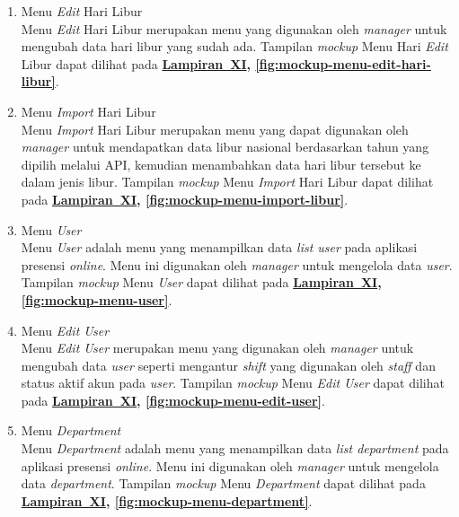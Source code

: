 \begin{enumerate}
    \item Menu \textit{Edit} Hari Libur
    \\ Menu \textit{Edit} Hari Libur merupakan menu yang digunakan oleh \textit{manager} untuk mengubah data hari libur yang sudah ada. Tampilan \textit{mockup} Menu Hari \textit{Edit} Libur dapat dilihat pada \textbf{\hyperref[sec:mockup-aplikasi-presensi-online]{Lampiran~XI}, \ref{fig:mockup-menu-edit-hari-libur}}.

    \item Menu \textit{Import} Hari Libur
    \\ Menu \textit{Import} Hari Libur merupakan menu yang dapat digunakan oleh \textit{manager} untuk mendapatkan data libur nasional berdasarkan tahun yang dipilih melalui API, kemudian menambahkan data hari libur tersebut ke dalam jenis libur. Tampilan \textit{mockup} Menu \textit{Import} Hari Libur dapat dilihat pada \textbf{\hyperref[sec:mockup-aplikasi-presensi-online]{Lampiran~XI}, \ref{fig:mockup-menu-import-libur}}.

    \item Menu \textit{User}
    \\ Menu \textit{User} adalah menu yang menampilkan data \textit{list user} pada aplikasi presensi \textit{online}. Menu ini digunakan oleh \textit{manager} untuk mengelola data \textit{user}. Tampilan \textit{mockup} Menu \textit{User} dapat dilihat pada \textbf{\hyperref[sec:mockup-aplikasi-presensi-online]{Lampiran~XI}, \ref{fig:mockup-menu-user}}.

    \item Menu \textit{Edit User}
    \\ Menu \textit{Edit User} merupakan menu yang digunakan oleh \textit{manager} untuk mengubah data \textit{user} seperti mengantur \textit{shift} yang digunakan oleh \textit{staff} dan status aktif akun pada \textit{user}. Tampilan \textit{mockup} Menu \textit{Edit User} dapat dilihat pada \textbf{\hyperref[sec:mockup-aplikasi-presensi-online]{Lampiran~XI}, \ref{fig:mockup-menu-edit-user}}.

    \item Menu \textit{Department}
    \\ Menu \textit{Department} adalah menu yang menampilkan data \textit{list department} pada aplikasi presensi \textit{online}. Menu ini digunakan oleh \textit{manager} untuk mengelola data \textit{department}. Tampilan \textit{mockup} Menu \textit{Department} dapat dilihat pada \textbf{\hyperref[sec:mockup-aplikasi-presensi-online]{Lampiran~XI}, \ref{fig:mockup-menu-department}}.


\end{enumerate}
